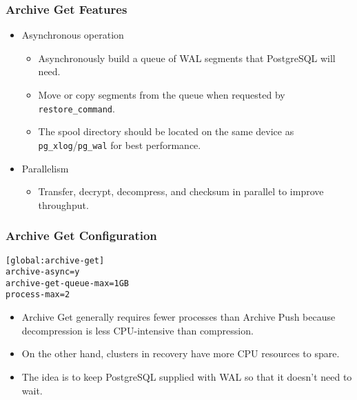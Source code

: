 \begin{frame}
    \frametitle{Archive Get Features}

    \begin{itemize}
        \item Asynchronous operation

        \begin{itemize}
            \item Asynchronously build a queue of WAL segments that PostgreSQL will need.\pause
            \item Move or copy segments from the queue when requested by \texttt{restore\_command}.\pause
            \item The spool directory should be located on the same device as \texttt{pg\_xlog}/\texttt{pg\_wal} for best performance.\pause
        \end{itemize}

        \item Parallelism

        \begin{itemize}
            \item Transfer, decrypt, decompress, and checksum in parallel to improve throughput.
        \end{itemize}
    \end{itemize}
\end{frame}

\begin{frame}[fragile]
    \frametitle{Archive Get Configuration}

    \vspace{.75em}\begin{lstlisting}[title=pgbackrest.conf]
[global:archive-get]
archive-async=y
archive-get-queue-max=1GB
process-max=2
    \end{lstlisting}\pause\vspace{1em}

    \begin{itemize}
        \item Archive Get generally requires fewer processes than Archive Push because decompression is less CPU-intensive than compression.\pause
        \item On the other hand, clusters in recovery have more CPU resources to spare.\pause
        \item The idea is to keep PostgreSQL supplied with WAL so that it doesn't need to wait.
    \end{itemize}
\end{frame}

